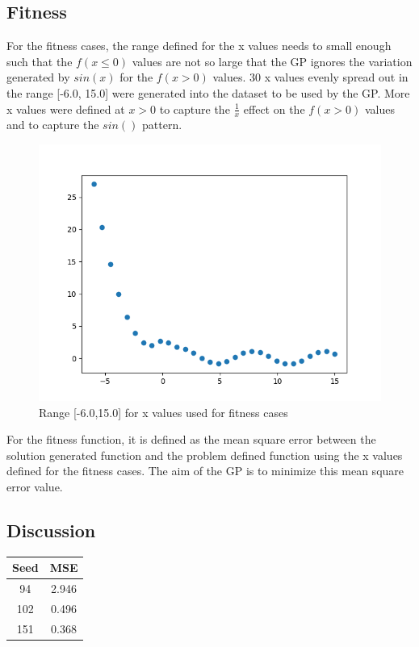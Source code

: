 \documentclass{article}
\begin{document}
\subsection*{Fitness}
For the fitness cases, the range defined for the x values needs to small enough such that the $f(x \leq 0)$ values are not so large that the GP ignores the variation generated by $sin(x)$ for the $f(x > 0)$ values. 30 x values evenly spread out in the range [-6.0, 15.0] were generated into the dataset to be used by the GP. More x values were defined at $x > 0$ to capture the $\frac{1}{x}$ effect on the $f(x > 0)$ values and to capture the $sin()$ pattern.\par
\begin{figure}[h!]
	\includegraphics[width=\linewidth]{x_values.png}
	\caption{Range [-6.0,15.0] for x values used for fitness cases}
\end{figure}
\noindent For the fitness function, it is defined as the mean square error between the solution generated function and the problem defined function using the x values defined for the fitness cases. The aim of the GP is to minimize this mean square error value. \par
\subsection*{Discussion}
\begin{center}
\begin{tabular}{|c|c|}
\hline
Seed & MSE \\ 
\hline
94 & 2.946 \\
\hline
102 & 0.496 \\
\hline
151 & 0.368 \\
\hline
\end{tabular}
\end{center}
\end{document}
